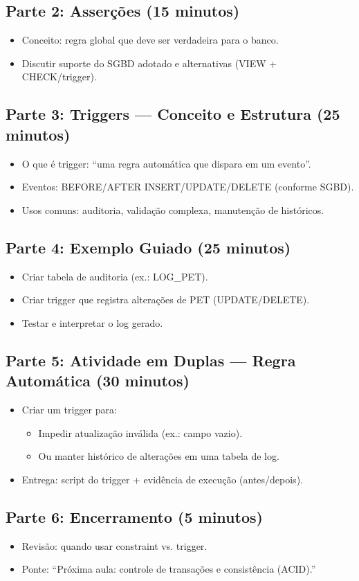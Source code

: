 \documentclass[12pt,a4paper]{article}
\begin{document}
\subsection*{Parte 2: Asserções (15 minutos)}
\begin{itemize}[leftmargin=*,itemsep=0.35em]
  \item Conceito: regra global que deve ser verdadeira para o banco.
  \item Discutir suporte do SGBD adotado e alternativas (VIEW + CHECK/trigger).
\end{itemize}

\subsection*{Parte 3: Triggers --- Conceito e Estrutura (25 minutos)}
\begin{itemize}[leftmargin=*,itemsep=0.35em]
  \item O que é trigger: ``uma regra automática que dispara em um evento''.
  \item Eventos: BEFORE/AFTER INSERT/UPDATE/DELETE (conforme SGBD).
  \item Usos comuns: auditoria, validação complexa, manutenção de históricos.
\end{itemize}

\subsection*{Parte 4: Exemplo Guiado (25 minutos)}
\begin{itemize}[leftmargin=*,itemsep=0.35em]
  \item Criar tabela de auditoria (ex.: LOG\_PET).
  \item Criar trigger que registra alterações de PET (UPDATE/DELETE).
  \item Testar e interpretar o log gerado.
\end{itemize}

\subsection*{Parte 5: Atividade em Duplas --- Regra Automática (30 minutos)}
\begin{itemize}[leftmargin=*,itemsep=0.35em]
  \item Criar um trigger para:
  \begin{itemize}[leftmargin=*,itemsep=0.25em]
    \item Impedir atualização inválida (ex.: campo vazio).
    \item Ou manter histórico de alterações em uma tabela de log.
  \end{itemize}
  \item Entrega: script do trigger + evidência de execução (antes/depois).
\end{itemize}

\subsection*{Parte 6: Encerramento (5 minutos)}
\begin{itemize}[leftmargin=*,itemsep=0.35em]
  \item Revisão: quando usar constraint vs. trigger.
  \item Ponte: ``Próxima aula: controle de transações e consistência (ACID).''
\end{itemize}
\end{document}
